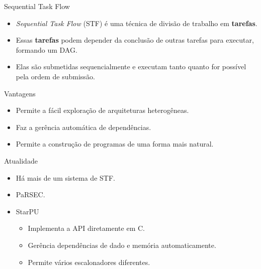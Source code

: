\documentclass{beamer}
\begin{document}
\begin{frame}{Sequential Task Flow}
  \begin{itemize}
  \item<+-> \textit{Sequential Task Flow} (STF) é uma técnica de divisão de trabalho em \textbf{tarefas}.
  \item<+-> Essas \textbf{tarefas} podem depender da conclusão de outras tarefas para executar, formando um DAG.
  \item<+-> Elas são submetidas sequencialmente e executam tanto quanto for possível pela ordem de submissão.
  \end{itemize}
\end{frame}

\begin{frame}{Vantagens}
  \begin{itemize}
  \item<+-> Permite a fácil exploração de arquiteturas heterogêneas.
  \item<+-> Faz a gerência automática de dependências.
  \item<+-> Permite a construção de programas de uma forma mais natural.
  \end{itemize}
\end{frame}


\begin{frame}{Atualidade}
  \begin{itemize}
  \item<+-> Há mais de um sistema de STF.
  \item<+-> PaRSEC.
  \item<+-> StarPU
    \begin{itemize}
    \item<+-> Implementa a API diretamente em C.
    \item<+-> Gerência dependências de dado e memória automaticamente.
    \item<+-> Permite vários escalonadores diferentes.
    \end{itemize}
  \end{itemize}
\end{frame}
\end{document}
